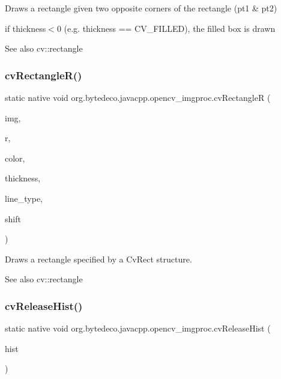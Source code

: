 Draws a rectangle given two opposite corners of the rectangle (pt1 \& pt2) 

if thickness$<$0 (e.\+g. thickness == C\+V\+\_\+\+F\+I\+L\+L\+ED), the filled box is drawn \begin{DoxySeeAlso}{See also}
cv\+::rectangle 
\end{DoxySeeAlso}
\mbox{\label{group__imgproc__c_ga6f6dac8e752a1dfc964c31c7048e1eec}} 
\subsubsection{\texorpdfstring{cv\+Rectangle\+R()}{cvRectangleR()}}
{\footnotesize\ttfamily static native void org.\+bytedeco.\+javacpp.\+opencv\+\_\+imgproc.\+cv\+RectangleR (\begin{DoxyParamCaption}\item[{Cv\+Arr}]{img,  }\item[{@By\+Val Cv\+Rect}]{r,  }\item[{@By\+Val Cv\+Scalar}]{color,  }\item[{int}]{thickness,  }\item[{int}]{line\+\_\+type,  }\item[{int}]{shift }\end{DoxyParamCaption})\hspace{0.3cm}{\ttfamily [static]}}



Draws a rectangle specified by a Cv\+Rect structure. 

\begin{DoxySeeAlso}{See also}
cv\+::rectangle 
\end{DoxySeeAlso}
\mbox{\label{group__imgproc__c_ga1b933b6d151c5e0f8f89ae1f445ed784}} 
\subsubsection{\texorpdfstring{cv\+Release\+Hist()}{cvReleaseHist()}}
{\footnotesize\ttfamily static native void org.\+bytedeco.\+javacpp.\+opencv\+\_\+imgproc.\+cv\+Release\+Hist (\begin{DoxyParamCaption}\item[{@Cast(\char`\"{}Cv\+Histogram$\ast$$\ast$\char`\"{}) Pointer\+Pointer}]{hist }\end{DoxyParamCaption})\hspace{0.3cm}{\ttfamily [static]}}



